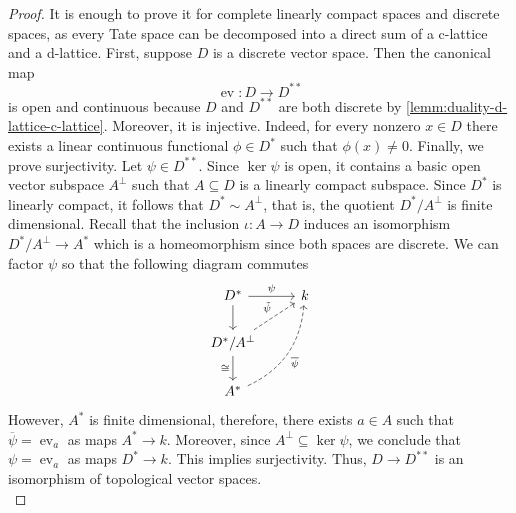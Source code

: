 \begin{proof}
	It is enough to prove it for complete linearly compact spaces and discrete spaces, as every Tate space can be decomposed into a direct sum of a c-lattice and a d-lattice. First, suppose $D$ is a discrete vector space. Then the canonical map
	\[
		\operatorname{ev}\colon D \to D^{**}
	\]
	is open and continuous because $D$ and $D^{**}$ are both discrete by \linebreak \cref{lemm:duality-d-lattice-c-lattice}. Moreover, it is injective. Indeed, for every nonzero $x \in D$ there exists a linear continuous functional $\phi\in D^{*}$ such that $\phi(x)\neq 0$. Finally, we prove surjectivity. Let $\psi \in D^{**}$. Since $\ker \psi$ is open, it contains a basic open vector subspace $A^{\perp}$ such that $A \subseteq D$ is a linearly compact subspace. Since $D^{*}$ is linearly compact, it follows that $D^{*} \sim A^{\perp}$, that is, the quotient $D^{*}/A^{\perp}$ is finite dimensional. Recall that the inclusion $\iota\colon A \to D$ induces an isomorphism $D^{*}/A^{\perp} \to A^{*}$ which is a homeomorphism since both spaces are discrete. We can factor $\psi$ so that the following diagram commutes
	\[
	\begin{tikzcd}
		D^{*} \arrow[r, "\psi"] \arrow[d] & k \\
		D^{*}/A^{\perp} \arrow[ru, dashed, "\tilde{\psi}"] \arrow[d, swap, "\cong"] & \\
		A^{*} \arrow[ruu, dashed, swap, bend right, "\overline{\psi}"]
	\end{tikzcd}
	\]
	However, $A^{*}$ is finite dimensional, therefore, there exists $a \in A$ such that $\overline{\psi} = \operatorname{ev}_{a}$ as maps $A^{*}\to k$. Moreover, since $A^{\perp} \subseteq \ker\psi$, we conclude that $\psi = \operatorname{ev}_{a}$ as maps $D^{*} \to k$. This implies surjectivity. Thus, $D \to D^{**}$ is an isomorphism of topological vector spaces. \\


\end{proof}
